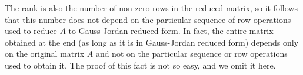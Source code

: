 The rank is also the number of non-zero rows in the
reduced  matrix, so it
follows that this number does not depend on the particular sequence
of row operations used to reduce $A$  to Gauss-Jordan reduced form. 
In fact, the entire matrix obtained  at the end (as
long as it is in Gauss-Jordan reduced form)  depends
only on the original matrix $A$ and not on the particular sequence
or row operations used to obtain it.
The proof of this fact is not so easy, and we omit it here.
\bigskip
\goodbreak

\endchapter
{}
\enddocument
